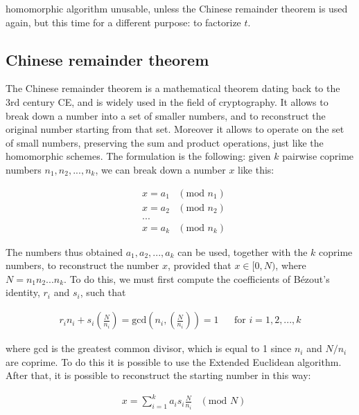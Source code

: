 homomorphic algorithm unusable, unless the Chinese remainder theorem is used again, but this time for a different purpose: to factorize $t$.

\subsection{Chinese remainder theorem}

The Chinese remainder theorem is a mathematical theorem dating back to the 3rd century CE, and is widely used in the field of cryptography. It allows to break down a number into a set of smaller numbers, and to reconstruct the original number starting from that set. Moreover it allows to operate on the set of small numbers, preserving the sum and product operations, just like the homomorphic schemes. The formulation is the following: given $k$ pairwise coprime numbers $n_1, n_2, ..., n_k$, we can break down a number $x$ like this:

\begin{align*}
    &x = a_1 & (\text{mod }n_1)\\
    &x = a_2 & (\text{mod }n_2)\\
    &...\\
    &x = a_k & (\text{mod }n_k)
\end{align*}

The numbers thus obtained $a_1, a_2, ..., a_k$ can be used, together with the $k$ coprime numbers, to reconstruct the number $x$, provided that $x\in[0,N)$, where $N=n_1n_2...n_k$. To do this, we must first compute the coefficients of Bézout's identity, $r_i$ and $s_i$, such that

\begin{align*}
    r_in_i+s_i\left(\frac{N}{n_i}\right) = \text{gcd}\left(n_i, \left(\frac{N}{n_i}\right)\right) = 1 && \text{for }i=1,2,...,k
\end{align*}


\noindent where gcd is the greatest common divisor, which is equal to 1 since $n_i$ and $N/n_i$ are coprime. To do this it is possible to use the Extended Euclidean algorithm. After that, it is possible to reconstruct the starting number in this way:

\begin{align*}
    & x = \sum\limits_{i=1}^k a_i s_i \frac{N}{n_i} & (\text{mod }N)
\end{align*}

